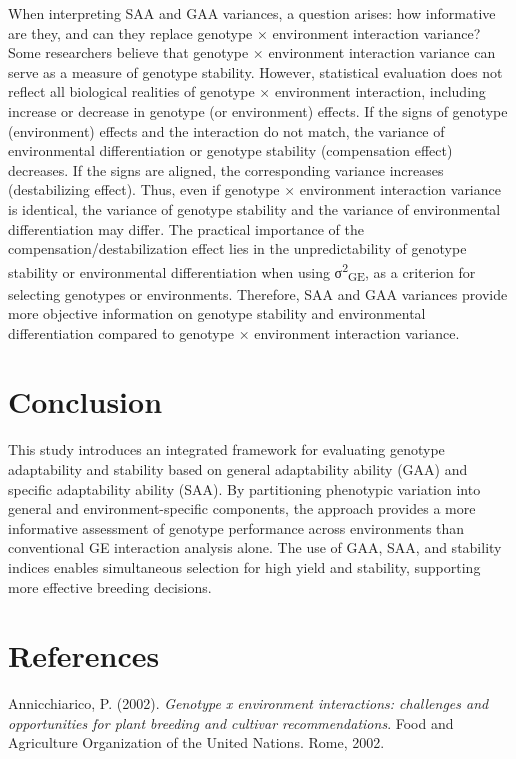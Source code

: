 \documentclass[
]{article}
\begin{document}
When interpreting SAA and GAA variances, a question arises: how
informative are they, and can they replace genotype × environment
interaction variance? Some researchers believe that genotype ×
environment interaction variance can serve as a measure of genotype
stability. However, statistical evaluation does not reflect all
biological realities of genotype × environment interaction, including
increase or decrease in genotype (or environment) effects. If the signs
of genotype (environment) effects and the interaction do not match, the
variance of environmental differentiation or genotype stability
(compensation effect) decreases. If the signs are aligned, the
corresponding variance increases (destabilizing effect). Thus, even if
genotype × environment interaction variance is identical, the variance
of genotype stability and the variance of environmental differentiation
may differ. The practical importance of the compensation/destabilization
effect lies in the unpredictability of genotype stability or
environmental differentiation when using
σ\textsuperscript{2}\textsubscript{GE}, as a criterion for selecting
genotypes or environments. Therefore, SAA and GAA variances provide more
objective information on genotype stability and environmental
differentiation compared to genotype × environment interaction variance.

\hypertarget{conclusion}{%
\section{Conclusion}\label{conclusion}}

This study introduces an integrated framework for evaluating genotype
adaptability and stability based on general adaptability ability (GAA)
and specific adaptability ability (SAA). By partitioning phenotypic
variation into general and environment-specific components, the approach
provides a more informative assessment of genotype performance across
environments than conventional GE interaction analysis alone. The use of
GAA, SAA, and stability indices enables simultaneous selection for high
yield and stability, supporting more effective breeding decisions.

\hypertarget{references}{%
\section{References}\label{references}}

Annicchiarico, P. (2002). \emph{Genotype x environment interactions:
challenges and opportunities for plant breeding and cultivar
recommendations}. Food and Agriculture Organization of the United
Nations. Rome, 2002.
\end{document}
